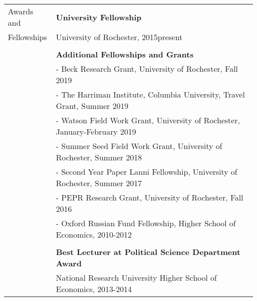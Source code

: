 \documentclass[letterpaper,11pt,oneside]{article}
\begin{document}
\noindent \begin{tabular}{@{} l l} 
	\Large{Awards and }    
	& \textbf{University Fellowship
	} \\
	\Large{Fellowships}   & University of Rochester, 2015\textendash present  \\
	& \\
         & \textbf{Additional Fellowships and Grants} \\
         & - Beck Research Grant, University of Rochester, Fall 2019 \\
           & - The Harriman Institute, Columbia University, Travel Grant, Summer 2019 \\
               & - Watson Field Work Grant, University of Rochester, January-February 2019 \\
          &-  Summer Seed Field Work Grant, University of Rochester, Summer 2018  \\
     & - Second Year Paper Lanni Fellowship, University of Rochester, Summer 2017\\
      &-  PEPR Research Grant, University of Rochester, Fall 2016 \\
         & - Oxford Russian Fund Fellowship, Higher School of Economics, 2010-2012 \\
& \\
           & \textbf{Best Lecturer at Political Science Department Award} \\
          & National Research University Higher School of Economics, 2013-2014 \\


\end{tabular}
\end{document}

